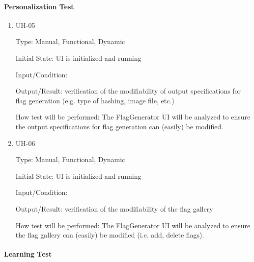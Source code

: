 \documentclass[12pt, titlepage]{article}
\begin{document}
\paragraph{Personalization Test}

\begin{enumerate}

\item{UH-05\\}

Type: Manual, Functional, Dynamic

Initial State: UI is initialized and running

Input/Condition: 

Output/Result: verification of the modifiability of output specifications for
flag generation (e.g. type of hashing, image file, etc.)

How test will be performed: The FlagGenerator UI will be analyzed to ensure
the output specifications for flag generation can (easily) be modified.

\item{UH-06\\}

Type: Manual, Functional, Dynamic

Initial State: UI is initialized and running

Input/Condition: 

Output/Result: verification of the modifiability of the flag gallery

How test will be performed: The FlagGenerator UI will be analyzed to ensure
the flag gallery can (easily) be modified (i.e. add, delete flags).

\end{enumerate}

\paragraph{Learning Test}
\end{document}
